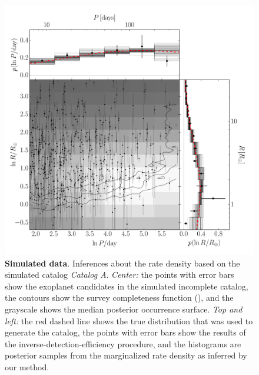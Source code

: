 \documentclass[12pt,preprint]{aastex}
\newcommand{\figlabel}[1]{\label{fig:#1}}
\newcommand{\modela}{\emph{Catalog A}}
\begin{document}
\begin{figure}[p]
\begin{center}
\includegraphics[width=\textwidth]{figures/smooth/results.pdf}
\end{center}
\caption{%
{\bf Simulated data}.
Inferences about the rate density based on the simulated catalog \modela.
\emph{Center:} the points with error bars show the exoplanet candidates in the
simulated incomplete catalog, the contours show the survey completeness
function (\citealt{petigura}), and the grayscale shows the median posterior
occurrence surface.
\emph{Top and left:} the red dashed line shows the true distribution that was
used to generate the catalog, the points with error bars show the results of
the inverse-detection-efficiency procedure, and the histograms are posterior
samples from the marginalized rate density as inferred by our method.
\figlabel{smooth-results}}
\end{figure}
\end{document}
